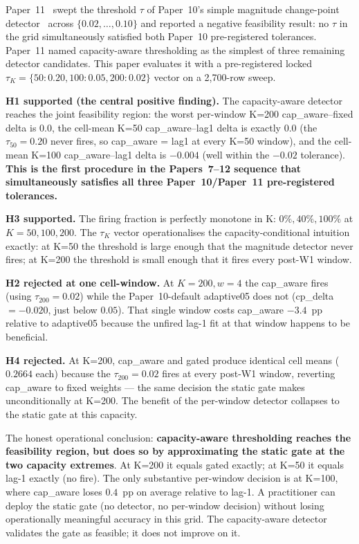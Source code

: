 Paper~11~\cite{paper11tau} swept the threshold $\tau$ of Paper~10's
simple magnitude change-point detector~\cite{paper10adaptive} across
$\{0.02, \ldots, 0.10\}$ and reported a negative feasibility result:
no $\tau$ in the grid simultaneously satisfied both Paper~10
pre-registered tolerances. Paper~11 named capacity-aware thresholding
as the simplest of three remaining detector candidates. This paper
evaluates it with a pre-registered locked $\tau_K = \{50: 0.20,
100: 0.05, 200: 0.02\}$ vector on a 2{,}700-row sweep.

\textbf{H1 supported (the central positive finding).} The capacity-aware
detector reaches the joint feasibility region: the worst per-window
K=200 cap\_aware--fixed delta is $0.0$, the cell-mean K=50
cap\_aware--lag1 delta is exactly $0.0$ (the $\tau_{50}=0.20$ never
fires, so cap\_aware = lag1 at every K=50 window), and the cell-mean
K=100 cap\_aware--lag1 delta is $-0.004$ (well within the $-0.02$
tolerance). \textbf{This is the first procedure in the Papers~7--12
sequence that simultaneously satisfies all three Paper~10/Paper~11
pre-registered tolerances.}

\textbf{H3 supported.} The firing fraction is perfectly monotone in
K: $0\%, 40\%, 100\%$ at $K = 50, 100, 200$. The $\tau_K$ vector
operationalises the capacity-conditional intuition exactly: at K=50
the threshold is large enough that the magnitude detector never fires;
at K=200 the threshold is small enough that it fires every post-W1
window.

\textbf{H2 rejected at one cell-window.} At $K=200, w=4$ the
cap\_aware fires (using $\tau_{200}=0.02$) while the
Paper~10-default adaptive05 does not (cp\_delta $= -0.020$, just
below $0.05$). That single window costs cap\_aware $-3.4$~pp
relative to adaptive05 because the unfired lag-1 fit at that window
happens to be beneficial.

\textbf{H4 rejected.} At K=200, cap\_aware and gated produce
identical cell means ($0.2664$ each) because the
$\tau_{200}=0.02$ fires at every post-W1 window, reverting cap\_aware
to fixed weights --- the same decision the static gate makes
unconditionally at K=200. The benefit of the per-window detector
collapses to the static gate at this capacity.

The honest operational conclusion: \textbf{capacity-aware thresholding
reaches the feasibility region, but does so by approximating the
static gate at the two capacity extremes}. At K=200 it equals gated
exactly; at K=50 it equals lag-1 exactly (no fire). The only
substantive per-window decision is at K=100, where cap\_aware loses
$0.4$~pp on average relative to lag-1. A practitioner can deploy
the static gate (no detector, no per-window decision) without losing
operationally meaningful accuracy in this grid. The capacity-aware
detector validates the gate as feasible; it does not improve on it.
